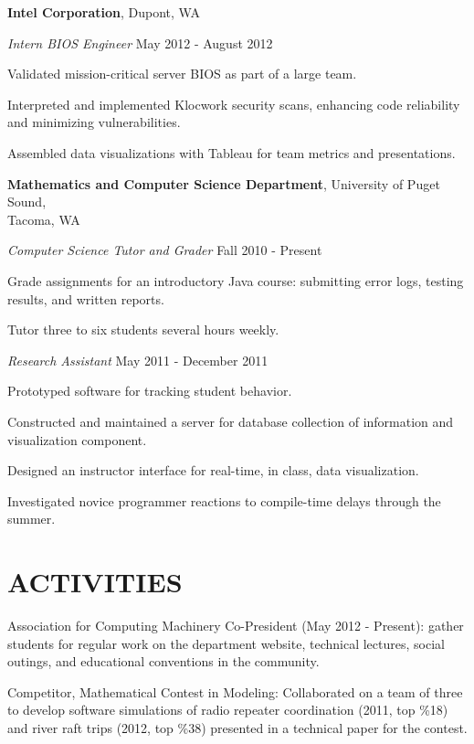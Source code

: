 \documentclass[line,margin]{res}
\newenvironment{itemize*}%
  {\begin{itemize}%
    \setlength{\parsep}{0pt}
    \setlength{\itemsep}{0pt}%
    \setlength{\parskip}{0pt}}%
  {\end{itemize}}
\begin{document}
\begin{resume}
\textbf{Intel Corporation}, Dupont, WA

{\sl Intern BIOS Engineer} \hfill May 2012 - August 2012
\begin{itemize*}
    \item Validated mission-critical server BIOS as part of a large team.
    \item Interpreted and implemented Klocwork security scans, enhancing
        code reliability and minimizing vulnerabilities.
    \item Assembled data visualizations with Tableau for team metrics and
        presentations.
\end{itemize*}

\textbf{Mathematics and Computer Science Department},
University of Puget Sound,\\
Tacoma, WA

{\sl Computer Science Tutor and Grader} \hfill Fall 2010 - Present
\begin{itemize*}
    \item Grade assignments for an introductory Java course: submitting
      error logs, testing results, and written reports.
    \item Tutor three to six students several hours weekly.
\end{itemize*}

{\sl Research Assistant} \hfill May 2011 - December 2011
\begin{itemize*}
    \item Prototyped software for tracking student behavior.
    \item Constructed and maintained a server for database collection of
      information and visualization component.
    \item Designed an instructor interface for real-time, in class, data
      visualization.
    \item Investigated novice programmer reactions to compile-time delays
        through the summer.
\end{itemize*}

\vspace*{.2cm}

\section{ACTIVITIES}

\begin{itemize*}
\item Association for Computing Machinery Co-President (May 2012 - Present): gather
    students for regular work on the department website, technical lectures,
    social outings, and educational conventions in the community.
\item Competitor, Mathematical Contest in Modeling: Collaborated on a team of three to
    develop software simulations of radio repeater coordination (2011, top \%18) and river
    raft trips (2012, top \%38) presented in a technical paper for the contest.\\
\end{itemize*}


\end{resume}
\end{document}
